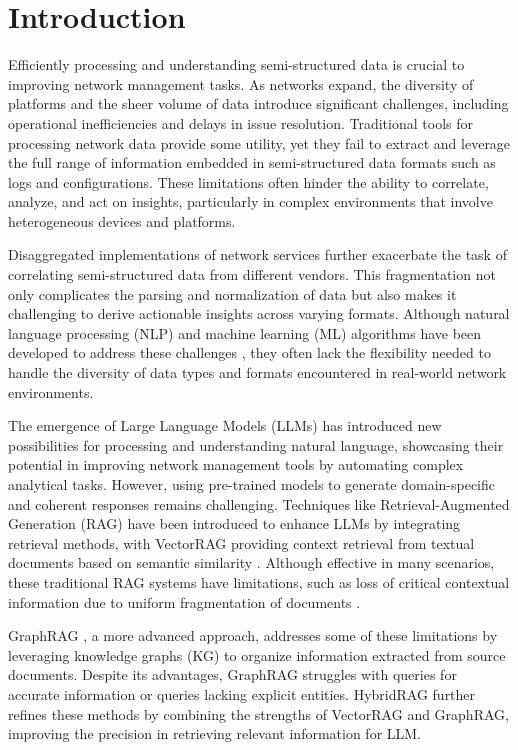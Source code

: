 \documentclass[conference]{IEEEtran}
\begin{document}
\section{Introduction}
Efficiently processing and understanding semi-structured data is crucial to improving network management tasks. As networks expand, the diversity of platforms and the sheer volume of data introduce significant challenges, including operational inefficiencies and delays in issue resolution. Traditional tools for processing network data \cite{min2017Deeplog, batfish2023, dna} provide some utility, yet they fail to extract and leverage the full range of information embedded in semi-structured data formats such as logs and configurations. These limitations often hinder the ability to correlate, analyze, and act on insights, particularly in complex environments that involve heterogeneous devices and platforms.

Disaggregated implementations of network services further exacerbate the task of correlating semi-structured data from different vendors. This fragmentation not only complicates the parsing and normalization of data but also makes it challenging to derive actionable insights across varying formats. Although natural language processing (NLP) and machine learning (ML) algorithms have been developed to address these challenges \cite{huo2023SemparserLog, birkner2022Config2spec}, they often lack the flexibility needed to handle the diversity of data types and formats encountered in real-world network environments.

The emergence of Large Language Models (LLMs) has introduced new possibilities for processing and understanding natural language, showcasing their potential in improving network management tools by automating complex analytical tasks. However, using pre-trained models to generate domain-specific and coherent responses remains challenging. Techniques like Retrieval-Augmented Generation (RAG) \cite{gao2024RagSurvey} have been introduced to enhance LLMs by integrating retrieval methods, with VectorRAG providing context retrieval from textual documents based on semantic similarity \cite{lewis2020RagNlp}. Although effective in many scenarios, these traditional RAG systems have limitations, such as loss of critical contextual information due to uniform fragmentation of documents \cite{sarmah2024HybridRag}.

GraphRAG \cite{edge2024GraphRag}, a more advanced approach, addresses some of these limitations by leveraging knowledge graphs (KG) to organize information extracted from source documents. Despite its advantages, GraphRAG struggles with queries for accurate information or queries lacking explicit entities. HybridRAG \cite{sarmah2024HybridRag} further refines these methods by combining the strengths of VectorRAG and GraphRAG, improving the precision in retrieving relevant information for LLM.
\end{document}
